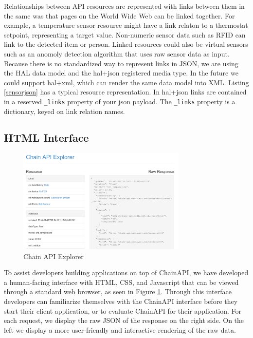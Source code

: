 \documentclass{acm_proc_article-sp}
\begin{document}
Relationships between API resources are represented with links between them in
the same was that pages on the World Wide Web can be linked together. For
example, a temperature sensor resource might have a link relaton to a
thermostat setpoint, representing a target value. Non-numeric sensor data such
as RFID can link to the detected item or person. Linked resources could also be
virtual sensors such as an anomoly detection algorithm that uses raw sensor
data as input. Because there is no standardized way to represent links in JSON,
we are using the HAL data model and the hal+json registered media type. In the
future we could support hal+xml, which can render the same data model into XML.
Listing \ref{sensorjson} has a typical resource representation. In hal+json
links are contained in a reserved \texttt{\_links} property of your json
payload. The \texttt{\_links} property is a dictionary, keyed on link relation
names.

\subsection{HTML Interface}

\begin{figure}
    \centering
    \includegraphics[width=8.45cm, frame]{chain_explorer2}
    \caption{Chain API Explorer}
    \label{chain_explorer}
\end{figure}

To assist developers building applications on top of ChainAPI, we have
developed a human-facing interface with HTML, CSS, and Javascript that can be
viewed through a standard web browser, as seen in Figure \ref{chain_explorer}.
Through this interface developers can familiarize themselves with the ChainAPI
interface before they start their client application, or to evaluate ChainAPI
for their application. For each request, we display the raw JSON of the
response on the right side. On the left we display a more user-friendly and
interactive rendering of the raw data.
\end{document}
